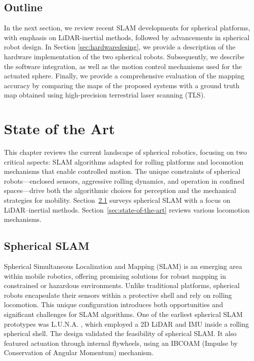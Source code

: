 \documentclass[english, bachelor, utf8]{base/thesis_telematics}
\begin{document}
\section{Outline}
In the next section, we review recent SLAM developments for spherical platforms, with emphasis on LiDAR-inertial methods, followed by advancements in spherical robot design.
In Section \ref{sec:hardwaredesing}, we provide a description of the hardware implementation of the two spherical robots. 
Subsequently, we describe the software integration, as well as the motion control mechanisms used for the actuated sphere. 
Finally, we provide a comprehensive evaluation of the mapping accuracy by comparing the maps of the proposed systems with a ground truth map obtained using high-precision terrestrial laser scanning (TLS). 


\chapter{State of the Art}
This chapter reviews the current landscape of spherical robotics, focusing on two critical aspects: SLAM algorithms adapted for rolling platforms and locomotion mechanisms that enable controlled motion. The unique constraints of spherical robots—enclosed sensors, aggressive rolling dynamics, and operation in confined spaces—drive both the algorithmic choices for perception and the mechanical strategies for mobility. Section~\ref{AA} surveys spherical SLAM with a focus on LiDAR–inertial methods. Section~\ref{sec:state-of-the-art} reviews various locomotion mechanisms.

\section{Spherical SLAM}\label{AA}
Spherical Simultaneous Localization and Mapping (SLAM) is an emerging area within mobile robotics, offering promising solutions for robust mapping in constrained or hazardous environments. 
Unlike traditional platforms, spherical robots encapsulate their sensors within a protective shell and rely on rolling locomotion. 
This unique configuration introduces both opportunities and significant challenges for SLAM algorithms. 
One of the earliest spherical SLAM prototypes was L.U.N.A. \cite{luna}, which employed a 2D LiDAR and IMU inside a rolling spherical shell. 
The design validated the feasibility of spherical SLAM. 
It also featured actuation through internal flywheels, using an IBCOAM (Impulse by Conservation of Angular Momentum) mechanism.
\end{document}
